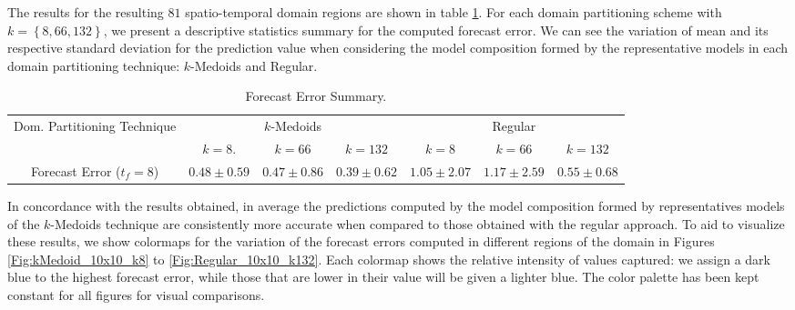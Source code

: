 The results for the resulting $81$ spatio-temporal domain regions are shown in table \ref{Table:Query10x10_kMedoids_Regular_StatSummary}. For each domain partitioning scheme with $k = \left\{8, 66, 132 \right\}$, we present a descriptive statistics summary for the computed forecast error. We can see the variation of mean and its respective standard deviation for the prediction value when considering the model composition formed by the representative models in each domain partitioning technique: $k$-Medoids and Regular.

\begin{table}[h!]
	\centering
	\tiny
	\begin{tabular}{|c|c|c|c|c|c|c|}
		\hline
		\multirow{2}{*}{Dom. Partitioning Technique} & \multicolumn{3}{c|}{$k$-Medoids} & \multicolumn{3}{c|}{Regular} \\
		\cline{2-7}
		& $k = 8$. & $k = 66$ & $k = 132$ & $k = 8$ & $k = 66$ & $k = 132$ \\
		\cline{2-7}
		\hline
		Forecast Error ($t_{f}=8$) & $0.48 \pm 0.59$ & $0.47 \pm 0.86$ & $0.39 \pm 0.62$ & $1.05 \pm 2.07$ & $1.17 \pm 2.59$ & $0.55 \pm 0.68$	 \\
		\hline
	\end{tabular}
	\caption{Forecast Error Summary.}
	\label{Table:Query10x10_kMedoids_Regular_StatSummary}
\end{table}

In concordance with the results obtained, in average the predictions computed by the model composition formed by representatives models of the $k$-Medoids technique are consistently more accurate when compared to those obtained with the regular approach. To aid to visualize these results, we show colormaps for the variation of the forecast errors computed in different regions of the domain in Figures \ref{Fig:kMedoid_10x10_k8} to \ref{Fig:Regular_10x10_k132}. Each colormap shows the relative intensity of values captured: we assign a dark blue to the highest forecast error, while those that are lower in their value will be given a lighter blue. The color palette has been kept constant for all figures for visual comparisons.

